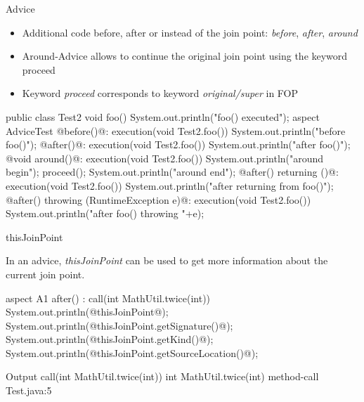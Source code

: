 \begin{frame}[fragile]{Advice}
	\begin{mycolumns}[widths={38,62},animation=none]
		\begin{note}{}
			\begin{itemize}
				\item Additional code before, after or instead of the join point: \emph{before}, \emph{after}, \emph{around}
				\item Around-Advice allows to continue the original join point using the keyword proceed
				\item Keyword \emph{proceed} corresponds to keyword \emph{original/super} in FOP
			\end{itemize}
		\end{note}
	\mynextcolumn
{\small
\begin{codetight}{}
public class Test2 {
	void foo() {
		System.out.println("foo() executed");
	}
}
aspect AdviceTest {
	@before()@: execution(void Test2.foo()) {
		System.out.println("before foo()");
	}
	@after()@: execution(void Test2.foo()) {
		System.out.println("after foo()");
	}
	@void around()@: execution(void Test2.foo()) {
		System.out.println("around begin");
		proceed();
		System.out.println("around end");
	}
	@after() returning ()@: execution(void Test2.foo()) {
		System.out.println("after returning from foo()");
	}
	@after() throwing (RuntimeException e)@: execution(void Test2.foo()) {
		System.out.println("after foo() throwing "+e);
	}
}
\end{codetight}
}
	\end{mycolumns}
\end{frame}

\begin{frame}[fragile]{thisJoinPoint}
	\begin{mycolumns}[widths={30,70},animation=none]
		\begin{note}{}
			In an advice, \emph{thisJoinPoint} can be used to get more information about the current join point.
		\end{note}
	\mynextcolumn
\begin{codetight}{}
aspect A1 {
	after() : call(int MathUtil.twice(int)) {
		System.out.println(@thisJoinPoint@);
		System.out.println(@thisJoinPoint.getSignature()@);
		System.out.println(@thisJoinPoint.getKind()@);
		System.out.println(@thisJoinPoint.getSourceLocation()@);
	}
}
\end{codetight}
\begin{codetight}{Output}
call(int MathUtil.twice(int))
int MathUtil.twice(int)
method-call
Test.java:5
\end{codetight}
	\end{mycolumns}
\end{frame}

